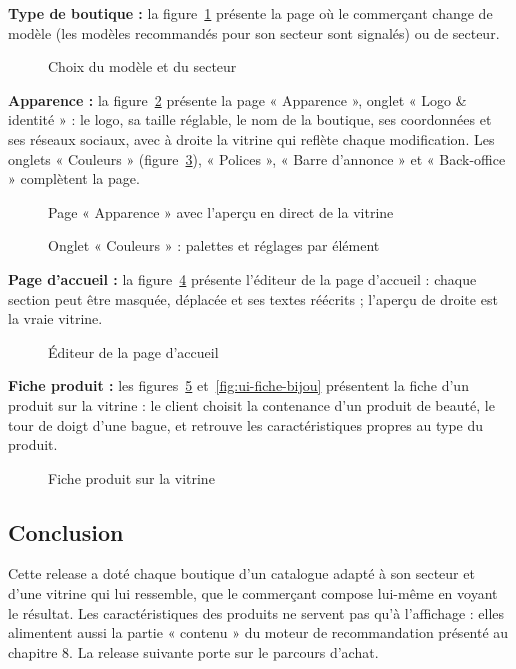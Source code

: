 \textbf{Type de boutique :} la figure~\ref{fig:ui-configuration} présente la page où le commerçant change de modèle (les modèles recommandés pour son secteur sont signalés) ou de secteur.
\begin{figure}[H]
    \centering
    \caption{Choix du modèle et du secteur}
    \label{fig:ui-configuration}
\end{figure}

\textbf{Apparence :} la figure~\ref{fig:ui-apparence} présente la page « Apparence », onglet « Logo \& identité » : le logo, sa taille réglable, le nom de la boutique, ses coordonnées et ses réseaux sociaux, avec à droite la vitrine qui reflète chaque modification. Les onglets « Couleurs » (figure~\ref{fig:ui-theme}), « Polices », « Barre d'annonce » et « Back-office » complètent la page.
\begin{figure}[H]
    \centering
    \caption{Page « Apparence » avec l'aperçu en direct de la vitrine}
    \label{fig:ui-apparence}
\end{figure}
\begin{figure}[H]
    \centering
    \caption{Onglet « Couleurs » : palettes et réglages par élément}
    \label{fig:ui-theme}
\end{figure}

\textbf{Page d'accueil :} la figure~\ref{fig:ui-page-accueil} présente l'éditeur de la page d'accueil : chaque section peut être masquée, déplacée et ses textes réécrits ; l'aperçu de droite est la vraie vitrine.
\begin{figure}[H]
    \centering
    \caption{Éditeur de la page d'accueil}
    \label{fig:ui-page-accueil}
\end{figure}

\textbf{Fiche produit :} les figures~\ref{fig:ui-fiche} et~\ref{fig:ui-fiche-bijou} présentent la fiche d'un produit sur la vitrine : le client choisit la contenance d'un produit de beauté, le tour de doigt d'une bague, et retrouve les caractéristiques propres au type du produit.
\begin{figure}[H]
    \centering
    \caption{Fiche produit sur la vitrine}
    \label{fig:ui-fiche}
\end{figure}


\subsection*{Conclusion}
Cette release a doté chaque boutique d'un catalogue adapté à son secteur et d'une vitrine qui lui ressemble, que le commerçant compose lui-même en voyant le résultat. Les caractéristiques des produits ne servent pas qu'à l'affichage : elles alimentent aussi la partie « contenu » du moteur de recommandation présenté au chapitre 8. La release suivante porte sur le parcours d'achat.
